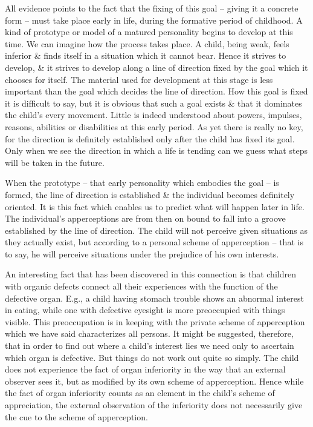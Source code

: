 \documentclass{article}
\begin{document}
All evidence points to the fact that the fixing of this goal -- giving it a concrete form -- must take place early in life, during the formative period of childhood. A kind of prototype or model of a matured personality begins to develop at this time. We can imagine how the process takes place. A child, being weak, feels inferior \& finds itself in a situation which it cannot bear. Hence it strives to develop, \& it strives to develop along a line of direction fixed by the goal which it chooses for itself. The material used for development at this stage is less important than the goal which decides the line of direction. How this goal is fixed it is difficult to say, but it is obvious that such a goal exists \& that it dominates the child's every movement. Little is indeed understood about powers, impulses, reasons, abilities or disabilities at this early period. As yet there is really no key, for the direction is definitely established only after the child has fixed its goal. Only when we see the direction in which a life is tending can we guess what steps will be taken in the future.

When the prototype -- that early personality which embodies the goal -- is formed, the line of direction is established \& the individual becomes definitely oriented. It is this fact which enables us to predict what will happen later in life. The individual's apperceptions are from then on bound to fall into a groove established by the line of direction. The child will not perceive given situations as they actually exist, but according to a personal scheme of apperception -- that is to say, he will perceive situations under the prejudice of his own interests.

An interesting fact that has been discovered in this connection is that children with organic defects connect all their experiences with the function of the defective organ. E.g., a child having stomach trouble shows an abnormal interest in eating, while one with defective eyesight is more preoccupied with things visible. This preoccupation is in keeping with the private scheme of apperception which we have said characterizes all persons. It might be suggested, therefore, that in order to find out where a child's interest lies we need only to ascertain which organ is defective. But things do not work out quite so simply. The child does not experience the fact of organ inferiority in the way that an external observer sees it, but as modified by its own scheme of apperception. Hence while the fact of organ inferiority counts as an element in the child's scheme of appreciation, the external observation of the inferiority does not necessarily give the cue to the scheme of apperception.
\end{document}
